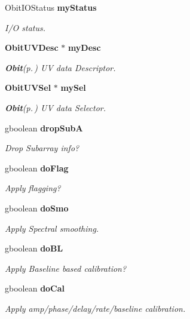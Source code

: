 \begin{CompactItemize}
Obit\-IOStatus {\bf my\-Status}
\begin{CompactList}\small\item\em I/O status. \item\end{CompactList}\item 
{\bf Obit\-UVDesc} $\ast$ {\bf my\-Desc}
\begin{CompactList}\small\item\em {\bf Obit}{\rm (p.\,\pageref{structObit})} UV data Descriptor. \item\end{CompactList}\item 
{\bf Obit\-UVSel} $\ast$ {\bf my\-Sel}
\begin{CompactList}\small\item\em {\bf Obit}{\rm (p.\,\pageref{structObit})} UV data Selector. \item\end{CompactList}\item 
gboolean {\bf drop\-Sub\-A}
\begin{CompactList}\small\item\em Drop Subarray info? \item\end{CompactList}\item 
gboolean {\bf do\-Flag}
\begin{CompactList}\small\item\em Apply flagging? \item\end{CompactList}\item 
gboolean {\bf do\-Smo}
\begin{CompactList}\small\item\em Apply Spectral smoothing. \item\end{CompactList}\item 
gboolean {\bf do\-BL}
\begin{CompactList}\small\item\em Apply Baseline based calibration? \item\end{CompactList}\item 
gboolean {\bf do\-Cal}
\begin{CompactList}\small\item\em Apply amp/phase/delay/rate/baseline calibration. \item\end{CompactList}\item 

\end{CompactItemize}
